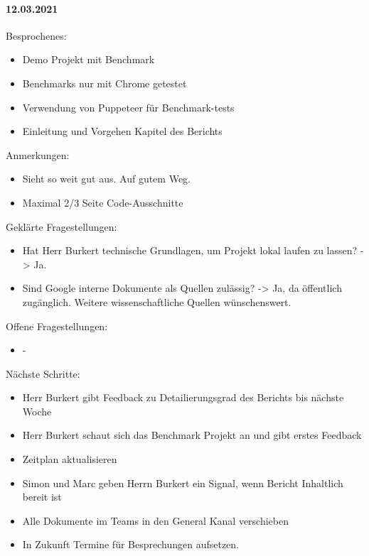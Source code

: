 \paragraph{12.03.2021}
Besprochenes:
\begin{itemize}
  \item Demo Projekt mit Benchmark
  \item Benchmarks nur mit Chrome getestet
  \item Verwendung von Puppeteer für Benchmark-tests
  \item Einleitung und Vorgehen Kapitel des Berichts
\end{itemize}
Anmerkungen:
\begin{itemize}
  \item Sieht so weit gut aus. Auf gutem Weg.
  \item Maximal 2/3 Seite Code-Ausschnitte
\end{itemize}
Geklärte Fragestellungen:
\begin{itemize}
  \item Hat Herr Burkert technische Grundlagen, um Projekt lokal laufen zu lassen? -> Ja.
  \item Sind Google interne Dokumente als Quellen zulässig? -> Ja, da öffentlich zugänglich. Weitere wissenschaftliche Quellen wünschenswert.
\end{itemize}
Offene Fragestellungen:
\begin{itemize}
  \item -
\end{itemize}
Nächste Schritte:
\begin{itemize}
  \item Herr Burkert gibt Feedback zu Detailierungsgrad des Berichts bis nächste Woche
  \item Herr Burkert schaut sich das Benchmark Projekt an und gibt erstes Feedback
  \item Zeitplan aktualisieren
  \item Simon und Marc geben Herrn Burkert ein Signal, wenn Bericht Inhaltlich bereit ist
  \item Alle Dokumente im Teams in den General Kanal verschieben
  \item In Zukunft Termine für Besprechungen aufsetzen.
\end{itemize}

\newpage

